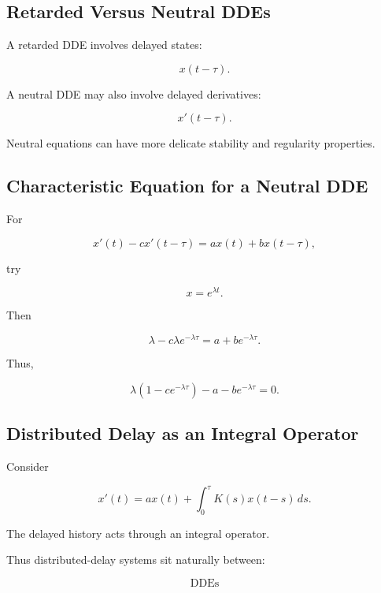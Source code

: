 \subsection{Retarded Versus Neutral DDEs}
\label{subsec:retarded-versus-neutral-ddes}

A retarded DDE involves delayed states:

\[
\boxed{
x(t-\tau).
}
\]

A neutral DDE may also involve delayed derivatives:

\[
\boxed{
x'(t-\tau).
}
\]

Neutral equations can have more delicate stability and regularity
properties.

\subsection{Characteristic Equation for a Neutral DDE}
\label{subsec:neutral-dde-characteristic}

For

\[
x'(t)
-
c x'(t-\tau)
=
ax(t)
+
bx(t-\tau),
\]

try

\[
x=e^{\lambda t}.
\]

Then

\[
\lambda
-
c\lambda e^{-\lambda\tau}
=
a
+
be^{-\lambda\tau}.
\]

Thus,

\[
\boxed{
\lambda
\left(
1-ce^{-\lambda\tau}
\right)
-
a
-
be^{-\lambda\tau}
=
0.
}
\]

\subsection{Distributed Delay as an Integral Operator}
\label{subsec:distributed-delay-integral-operator}

Consider

\[
x'(t)
=
ax(t)
+
\int_0^\tau
K(s)x(t-s)\,ds.
\]

The delayed history acts through an integral operator.

Thus distributed-delay systems sit naturally between:

\[
\boxed{
\text{DDEs}
}
\]

